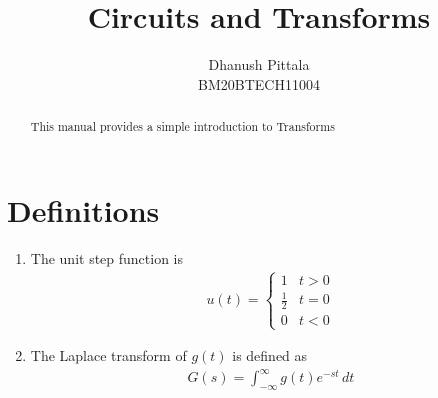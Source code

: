 \documentclass[journal,12pt,twocolumn]{IEEEtran}
\renewcommand\thesection{\arabic{section}}
\begin{document}
	\let\StandardTheFigure\thefigure
	\renewcommand{\thefigure}{\theproblem}
	\renewcommand{\thefigure}{\arabic{section}.\arabic{figure}}
	\makeatletter
	\makeatother
	
	
	\def\putbox#1#2#3{\makebox[0in][l]{\makebox[#1][l]{}\raisebox{\baselineskip}[0in][0in]{\raisebox{#2}[0in][0in]{#3}}}}
	\def\rightbox#1{\makebox[0in][r]{#1}}
	\def\centbox#1{\makebox[0in]{#1}}
	\def\topbox#1{\raisebox{-\baselineskip}[0in][0in]{#1}}
	\def\midbox#1{\raisebox{-0.5\baselineskip}[0in][0in]{#1}}
	
	\vspace{3cm}
	
	\title{ 
		Circuits and Transforms
	}
	
	\author{Dhanush Pittala\\BM20BTECH11004}
	
	\maketitle
	
	
	\tableofcontents
	
	
	\renewcommand{\thefigure}{\theenumi}
	\renewcommand{\thetable}{\theenumi}
	
	
	
	\bigskip
	
	\begin{abstract}
		This manual provides a simple introduction to Transforms
	\end{abstract}
	
	\section{Definitions}
	\begin{enumerate}[label=\arabic*.,ref=\thesection.\theenumi]
		\item The unit step function is 
		\begin{align}
			u(t) =
			\begin{cases}
				1 & t > 0
				\\
				\frac{1}{2} & t = 0
				\\
				0 & t < 0
			\end{cases}
		\end{align}
		\item The Laplace transform of $g(t)$ is defined as 
		\begin{align}
			G(s) = \int_{-\infty}^{\infty} g(t) e^{-st}\, dt
		\end{align}
	\end{enumerate}
	
\end{document}
